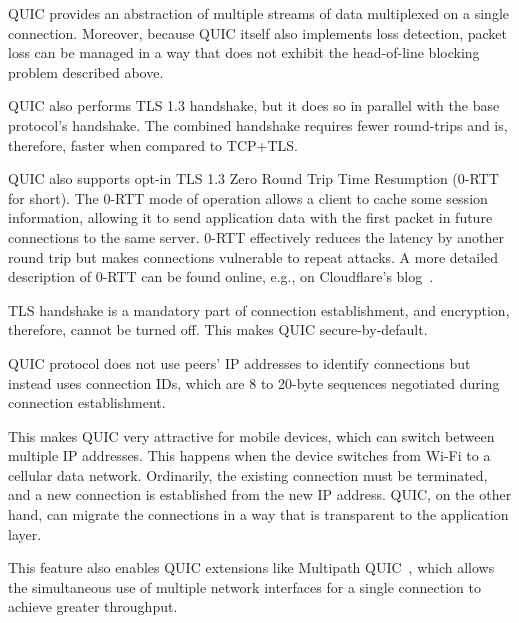 \begin{itemize}

     QUIC provides an abstraction of multiple streams of data multiplexed
    on a single connection. Moreover, because QUIC itself also implements loss detection, packet
    loss can be managed in a way that does not exhibit the head-of-line blocking problem described
    above.

     QUIC also performs TLS 1.3 handshake, but it does so in
    parallel with the base protocol's handshake. The combined handshake requires fewer round-trips
    and is, therefore, faster when compared to TCP+TLS\@.

    QUIC also supports opt-in TLS 1.3 Zero Round Trip Time Resumption (0-RTT for short). The 0-RTT
    mode of operation allows a client to cache some session information, allowing it to send
    application data with the first packet in future connections to the same server. 0-RTT
    effectively reduces the latency by another round trip but makes connections vulnerable to repeat
    attacks. A more detailed description of 0-RTT can be found online, e.g., on Cloudflare's
    blog~\cite{cloudflare-0rtt}.

     TLS handshake is a mandatory part of connection establishment, and
    encryption, therefore, cannot be turned off. This makes QUIC secure-by-default.

     QUIC protocol does not use peers'
    IP addresses to identify connections but instead uses connection IDs, which are 8 to 20-byte
    sequences negotiated during connection establishment.

    This makes QUIC very attractive for mobile devices, which can switch between multiple IP
    addresses. This happens when the device switches from Wi-Fi to a cellular data network.
    Ordinarily, the existing connection must be terminated, and a new connection is established from
    the new IP address. QUIC, on the other hand, can migrate the connections in a way that is
    transparent to the application layer.

    This feature also enables QUIC extensions like Multipath
    QUIC~\cite{draft-deconinck-quic-multipath-04}, which allows the simultaneous use of multiple
    network interfaces for a single connection to achieve greater throughput.

\end{itemize}

